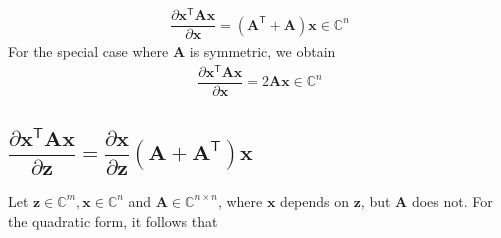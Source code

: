\documentclass{article}
\newcommand{\trans}{\mathsf{T}}
\begin{document}
\begin{align}
    \label{eq:quadratic-solution}
    \boxed{\dfrac{\partial \mathbf{x}^\trans \mathbf{A} \mathbf{x}}{\partial \mathbf{x}} = \left(\mathbf{A}^\trans + \mathbf{A}\right) \mathbf{x} \in \mathbb{C}^{n}}
\end{align}
For the special case where \(\mathbf{A}\) is symmetric, we obtain
\begin{align}
    \boxed{\dfrac{\partial \mathbf{x}^\trans \mathbf{A} \mathbf{x}}{\partial \mathbf{x}} = 2\mathbf{A} \mathbf{x} \in \mathbb{C}^{n}}
\end{align}

\subsection{\(\dfrac{\partial \mathbf{x}^\trans \mathbf{A} \mathbf{x}}{\partial \mathbf{z}} = \dfrac{\partial \mathbf{x}}{\partial \mathbf{z}}\left( \mathbf{A} + \mathbf{A}^\trans \right) \mathbf{x}\)}
Let \(\mathbf{z} \in \mathbb{C}^{m}, \mathbf{x} \in \mathbb{C}^{n}\) and \(\mathbf{A}\in \mathbb{C}^{n\times n}\), where \(\mathbf{x}\) depends on \(\mathbf{z}\), but \(\mathbf{A}\) does not. For the quadratic form, it follows that
\end{document}
